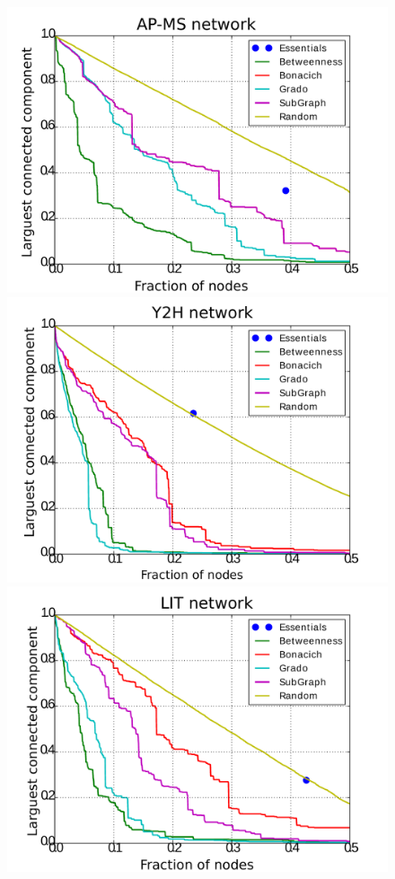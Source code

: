 \begin{figure}
\centering
\includegraphics[scale = 0.3]{figuras/AP-MS_b-eps-converted-to} 
\includegraphics[scale = 0.3]{figuras/Y2H_b-eps-converted-to} \\
\includegraphics[scale = 0.3]{figuras/LIT_b-eps-converted-to} 

\end{figure}
